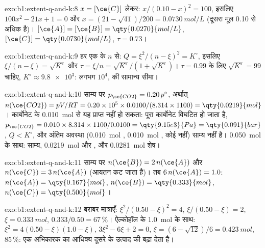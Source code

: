 \begin{solution}{exo:b1:extent-q-and-k:8}
$x = [\ce{C}]$ लेकर: $x/(0.10 - x)^2 = 100$, इसलिए $100x^2 - 21x + 1 = 0$ और
$x = (21 - \sqrt{41})/200 = \qty{0.0730}{mol/L}$ (दूसरा मूल
0.10 से अधिक है)। $[\ce{A}] = [\ce{B}] = \qty{0.0270}{mol/L}$, $[\ce{C}] =
\qty{0.0730}{mol/L}$, $\tau = 0.73$।
\end{solution}

\begin{solution}{exo:b1:extent-q-and-k:9}
हर एक के $n$ से: $Q = \xi^2/(n - \xi)^2 = K^\circ$, इसलिए $\xi/(n - \xi) =
\sqrt{K^\circ}$ और $\tau = \xi/n = \sqrt{K^\circ}/(1 + \sqrt{K^\circ})$।
$\tau = 0.99$ के लिए $\sqrt{K^\circ} = 99$ चाहिए, $K^\circ \approx \num{9.8e3}$:
लगभग $10^4$,  की सामान्य सीमा।
\end{solution}

\begin{solution}{exo:b1:extent-q-and-k:10}
साम्य पर $p_{\ce{CO2}} = 0.20\,p^\circ$, अर्थात् $n(\ce{CO2}) =
pV/RT = 0.20 \times 10^5 \times 0.0100/(8.314 \times 1100) =
\qty{0.0219}{mol}$। कार्बोनेट के \qty{0.010}{mol} से यह प्राप्त नहीं
हो सकता: पूरा कार्बोनेट विघटित हो जाता है, $p_{\ce{CO2}} = 0.010 \times 8.314 \times
1100/0.0100 = \qty{9.15e3}{Pa} = \qty{0.091}{bar}$, $Q < K^\circ$, और
अंतिम अवस्था (\qty{0.010}{mol} , \qty{0.010}{mol} , कोई
 नहीं) साम्य नहीं है। \qty{0.050}{mol} के साथ: साम्य,
\qty{0.0219}{mol}  और , और \qty{0.0281}{mol}  शेष।
\end{solution}

\begin{solution}{exo:b1:extent-q-and-k:11}
साम्य पर $n(\ce{B}) = 2\,n(\ce{A})$ और $n(\ce{C}) = 3\,n(\ce{A})$
(आयतन कट जाता है)। तब $6\,n(\ce{A}) = 1.0$: $n(\ce{A}) =
\qty{0.167}{mol}$, $n(\ce{B}) = \qty{0.333}{mol}$, $n(\ce{C}) =
\qty{0.500}{mol}$।
\end{solution}

\begin{solution}{exo:b1:extent-q-and-k:12}
बराबर मात्राएँ: $\xi^2/(0.50 - \xi)^2 = 4$, $\xi/(0.50 - \xi) = 2$,
$\xi = \qty{0.333}{mol}$,  $0.333/0.50 = 67\,\%$। ऐल्कोहॉल के \qty{1.0}{mol}
के साथ: $\xi^2 = 4(0.50 - \xi)(1.0 - \xi)$, $3\xi^2 - 6\xi + 2 = 0$,
$\xi = (6 - \sqrt{12})/6 = \qty{0.423}{mol}$,  85\,\%: एक अभिकारक का
आधिक्य दूसरे के उत्पाद की  बढ़ा देता है।
\end{solution}

